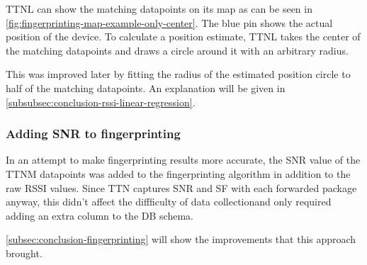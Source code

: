 \ac{TTNL} can show the matching datapoints on its map as can be seen in \cref{fig:fingerprinting-map-example-only-center}.
The blue pin shows the actual position of the device.
To calculate a position estimate, \ac{TTNL} takes the center of the matching datapoints and draws a circle around it with an arbitrary radius.

This was improved later by fitting the radius of the estimated position circle to half of the matching datapoints.
An explanation will be given in \cref{subsubsec:conclusion-rssi-linear-regression}.

\subsubsection{Adding \acf{SNR} to fingerprinting}\label{sec:adding-snr-to-fingerprinting}

In an attempt to make fingerprinting results more accurate, the \ac{SNR} value of the \ac{TTNM} datapoints was added to the fingerprinting algorithm in addition to the raw \ac{RSSI} values.
Since \ac{TTN} captures \ac{SNR} and \ac{SF} with each forwarded package anyway, this didn't affect the diffficulty of data collectionand only required adding an extra column to the \ac{DB} schema.

\cref{subsec:conclusion-fingerprinting} will show the improvements that this approach brought.